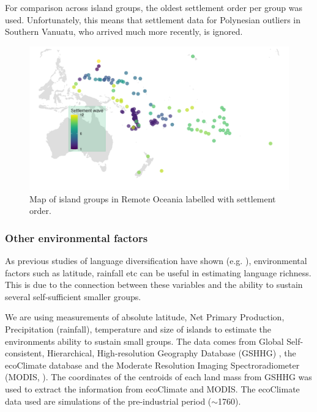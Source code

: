 \documentclass[a4paper,10pt]{article} %
\begin{document}
For comparison across island groups, the oldest settlement order per group was used. Unfortunately, this means that settlement data for Polynesian outliers in Southern Vanuatu, who arrived much more recently, is ignored.

\begin{figure}
\centering
\includegraphics[width=19cm]{Map_RO_dates.png}
\caption{{Map of island groups in Remote Oceania labelled with settlement order.}}
\label{dates_map}
\end{figure}

\FloatBarrier
\subsubsection{Other environmental factors} 
\label{appendix_environ}
As previous studies of language diversification have shown (e.g. \citet{ greenhill2015demographic, gavin2017process, Pacheco_Coelho_2019, hua2019ecological}), environmental factors such as latitude, rainfall etc can be useful in estimating language richness. This is due to the connection between these variables and the ability to sustain several self-sufficient smaller groups.


We are using measurements of absolute latitude, Net Primary Production, Precipitation (rainfall), temperature and size of islands to estimate the environments ability to sustain small groups. The data comes from Global Self-consistent, Hierarchical, High-resolution Geography Database (GSHHG) \citep{wessel1996global}, the ecoClimate database \citep{ecoclimate} and the Moderate Resolution Imaging Spectroradiometer (MODIS, \citet{running2021modis_terra, running2021modis_aqua}). The coordinates of the centroids of each land mass from GSHHG was used to extract the information from ecoClimate and MODIS. The ecoClimate data used are simulations of the pre-industrial period ($\sim$1760).
\end{document}

